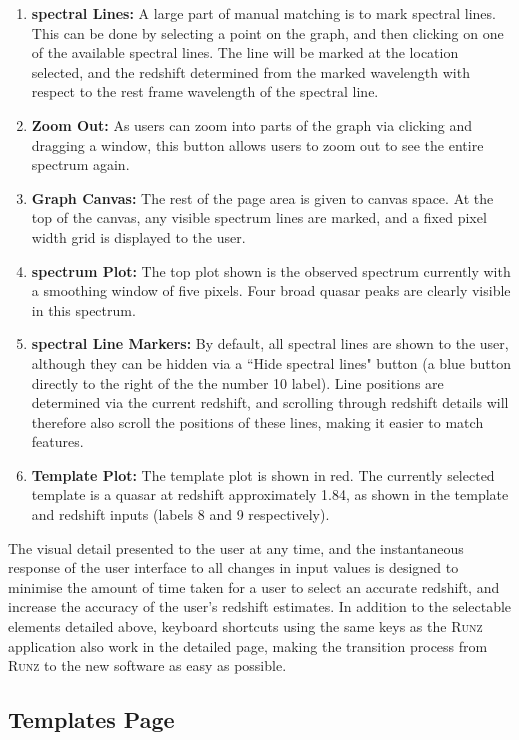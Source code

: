 \documentclass[titlesmallcaps, examinerscopy, copyrightpage]{uqthesis}
\newcommand{\runz}{\textsc{Runz}}
\begin{document}
\begin{enumerate}
\item \textbf{spectral Lines:} A large part of manual matching is to mark spectral lines. This can be done by selecting a point on the graph, and then clicking on one of the available spectral lines. The line will be marked at the location selected, and the redshift determined from the marked wavelength with respect to the rest frame wavelength of the spectral line.
\item \textbf{Zoom Out:} As users can zoom into parts of the graph via clicking and dragging a window, this button allows users to zoom out to see the entire spectrum again.
\item \textbf{Graph Canvas:} The rest of the page area is given to canvas space. At the top of the canvas, any visible spectrum lines are marked, and a fixed pixel width grid is displayed to the user.
\item \textbf{spectrum Plot:} The top plot shown is the observed spectrum currently with a smoothing window of five pixels. Four broad quasar peaks are clearly visible in this spectrum.
\item \textbf{spectral Line Markers:} By default, all spectral lines are shown to the user, although they can be hidden via a ``Hide spectral lines" button (a blue button directly to the right of the the number 10 label). Line positions are determined via the current redshift, and scrolling through redshift details will therefore also scroll the positions of these lines, making it easier to match features.
\item \textbf{Template Plot:} The template plot is shown in red. The currently selected template is a quasar at redshift approximately 1.84, as shown in the template and redshift inputs (labels 8 and 9 respectively).
\end{enumerate}

The visual detail presented to the user at any time, and the instantaneous response of the user interface to all changes in input values is designed to minimise the amount of time taken for a user to select an accurate redshift, and increase the accuracy of the user's redshift estimates. In addition to the selectable elements detailed above, keyboard shortcuts using the same keys as the \runz{} application also work in the detailed page, making the transition process from \runz{} to the new software as easy as possible.

\pagebreak
\subsection{Templates Page}
\end{document}
